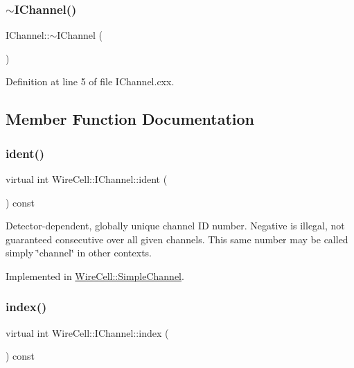 \subsubsection{\texorpdfstring{$\sim$\+I\+Channel()}{~IChannel()}}
{\footnotesize\ttfamily I\+Channel\+::$\sim$\+I\+Channel (\begin{DoxyParamCaption}{ }\end{DoxyParamCaption})\hspace{0.3cm}{\ttfamily [virtual]}}



Definition at line 5 of file I\+Channel.\+cxx.



\subsection{Member Function Documentation}
\mbox{\label{class_wire_cell_1_1_i_channel_a402dc3c45e1827f7437b7db059a834b1}} 
\subsubsection{\texorpdfstring{ident()}{ident()}}
{\footnotesize\ttfamily virtual int Wire\+Cell\+::\+I\+Channel\+::ident (\begin{DoxyParamCaption}{ }\end{DoxyParamCaption}) const\hspace{0.3cm}{\ttfamily [pure virtual]}}

Detector-\/dependent, globally unique channel ID number. Negative is illegal, not guaranteed consecutive over all given channels. This same number may be called simply \char`\"{}channel\char`\"{} in other contexts. 

Implemented in \hyperlink{class_wire_cell_1_1_simple_channel_a778b1796236fda53b95214f0e60d310a}{Wire\+Cell\+::\+Simple\+Channel}.

\mbox{\label{class_wire_cell_1_1_i_channel_a778ee7c6f6b69febe03862b4e2ae2a43}} 
\subsubsection{\texorpdfstring{index()}{index()}}
{\footnotesize\ttfamily virtual int Wire\+Cell\+::\+I\+Channel\+::index (\begin{DoxyParamCaption}{ }\end{DoxyParamCaption}) const\hspace{0.3cm}{\ttfamily [pure virtual]}}


